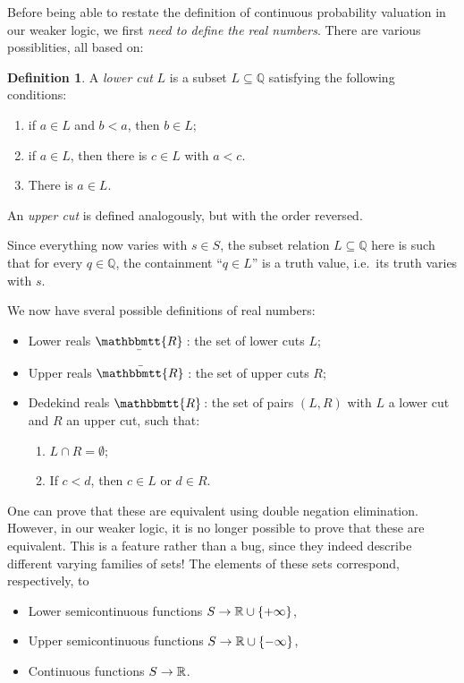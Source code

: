 \documentclass[11pt, oneside, article]{memoir}
\theoremstyle{plain}
\theoremstyle{definition}
\newtheorem{definition}[theorem]{Definition}
\theoremstyle{remark}
\newcommand{\ubar}[1]{\underaccent{\bar}{#1}}
\newcommand{\internal}[1]{\raisebox{-.03ex}{$\mathbbmtt{#1}$}}
\newcommand{\hs}{\hspace{1.1pt}}
\newcommand{\tRR}{\internal{R}\hs}
\newcommand{\tLR}{\ubar{\tRR}\hs}
\newcommand{\tUR}{\bar{\tRR}\hs}
\begin{document}
Before being able to restate the definition of continuous probability valuation in our weaker logic, we first \emph{need to define the real numbers}. There are various possiblities, all based on:

\newcommand{\Q}{\mathbb{Q}}

\begin{definition}
A \emph{lower cut} $L$ is a subset $L\subseteq\Q$ satisfying the following conditions:
\begin{enumerate}
\item if $a \in L$ and $b < a$, then $b\in L$;
\item if $a \in L$, then there is $c\in L$ with $a < c$.
\item There is $a\in L$.
\end{enumerate}
An \emph{upper cut} is defined analogously, but with the order reversed.
\end{definition}

Since everything now varies with $s\in S$, the subset relation $L \subseteq \Q$ here is such that for every $q\in\Q$, the containment ``$q\in L$'' is a truth value, i.e.~its truth varies with $s$.

We now have sveral possible definitions of real numbers:

\begin{itemize}
\item Lower reals $\tLR$: the set of lower cuts $L$;
\item Upper reals $\tUR$: the set of upper cuts $R$;
\item Dedekind reals $\tRR$: the set of pairs $(L,R)$ with $L$ a lower cut and $R$ an upper cut, such that:
\begin{enumerate}
\item $L \cap R = \emptyset$;
\item If $c < d$, then $c\in L$ or $d\in R$.
\end{enumerate}
\end{itemize}

One can prove that these are equivalent using double negation elimination. However, in our weaker logic, it is no longer possible to prove that these are equivalent. This is a feature rather than a bug, since they indeed describe different varying families of sets! The elements of these sets correspond, respectively, to

\begin{itemize}
\item Lower semicontinuous functions $S \to \mathbb{R} \cup \{+\infty\}$,
\item Upper semicontinuous functions $S \to \mathbb{R} \cup \{-\infty\}$,
\item Continuous functions $S \to \mathbb{R}$.
\end{itemize}
\end{document}
